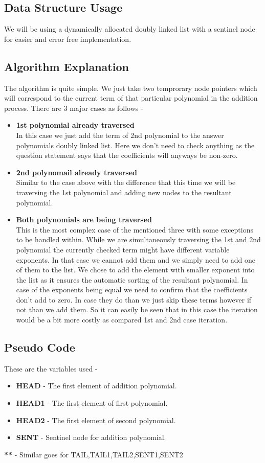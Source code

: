 \documentclass[20pt]{article}
\begin{document}
\subsection{Data Structure Usage}
We will be using a dynamically allocated doubly linked list with a sentinel node for easier and error free implementation.

\subsection{Algorithm Explanation}
The algorithm is quite simple. We just take two temprorary node pointers which will correspond to the current term of that particular polynomial in the addition process. There are 3 major cases as follows -

\begin{itemize}
\item \textbf{1st polynomial already traversed}
\\
In this case we just add the term of 2nd polynomial to the answer polynomials doubly linked list. Here we don't need to check anything as the question statement says that the coefficients will anyways be non-zero.

\item \textbf{2nd polynomail already traversed}
\\
Similar to the case above with the difference that this time we will be traversing the 1st polynomial and adding new nodes to the resultant polynomial.

\item \textbf{Both polynomials are being traversed}
\\
This is the most complex case of the mentioned three with some exceptions to be handled within. While we are simultaneously traversing the 1st and 2nd polynomial the currently checked term might have different variable exponents. In that case we cannot add them and we simply need to add one of them to the list. We chose to add the element with smaller exponent into the list as it ensures the automatic sorting of the resultant polynomial.
In case of the exponents being equal we need to confirm that the coefficients don't add to zero. In case they do than we just skip these terms however if not than we add them.
So it can easily be seen that in this case the iteration would be a bit more costly as compared 1st and 2nd case iteration.
\end{itemize}

\subsection{Pseudo Code}
These are the variables used - 
\begin{itemize}
\item \textbf{HEAD}   - The first element of addition polynomial.
\item \textbf{HEAD1} - The first element of first polynomial.
\item \textbf{HEAD2} - The first element of second polynomial.
\item \textbf{SENT}   - Sentinel node for addition polynomial.
\end{itemize}
\textbf{**} - Similar goes for {TAIL,TAIL1,TAIL2,SENT1,SENT2}
\end{document}
